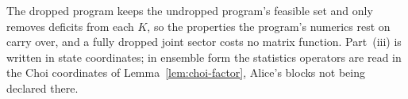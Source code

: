 
The dropped program keeps the undropped program's feasible set and only
removes deficits from each $K$, so the properties the program's numerics
rest on carry over, and a fully dropped joint sector costs no matrix
function. Part~(iii) is written in state coordinates; in ensemble form the
statistics operators are read in the Choi coordinates of
Lemma~\ref{lem:choi-factor}, Alice's blocks not being declared there.

